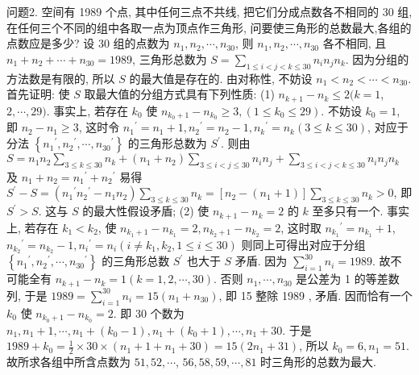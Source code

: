问题2. 空间有 1989 个点, 其中任何三点不共线, 把它们分成点数各不相同的 30 组,在任何三个不同的组中各取一点为顶点作三角形, 问要使三角形的总数最大,各组的点数应是多少? 
设 30 组的点数为 $n_1, n_2, \cdots, n_{30}$, 则 $n_1, n_2, \cdots, n_{30}$ 各不相同, 且 $n_1+ n_2+\cdots+n_{30}=1989$, 三角形总数为 $S=\sum_{1 \leqslant i<j<k \leqslant 30} n_i n_j n_k$. 因为分组的方法数是有限的, 所以 $S$ 的最大值是存在的.
由对称性, 不妨设 $n_1<n_2<\cdots<n_{30}$. 首先证明: 使 $S$ 取最大值的分组方式具有下列性质: (1) $n_{k+1}-n_k \leqslant 2(k=1$, $2, \cdots, 29)$. 事实上, 若存在 $k_0$ 使 $n_{k_0+1}-n_{k_0} \geqslant 3,\left(1 \leqslant k_0 \leqslant 29\right)$. 不妨设 $k_0=1$, 即 $n_2-n_1 \geqslant 3$, 这时令 $n_1{ }^{\prime}=n_1+1, n_2{ }^{\prime}=n_2-1, n_k{ }^{\prime}=n_k(3 \leqslant k \leqslant 30)$, 对应于分法 $\left\{n_1{ }^{\prime}, n_2{ }^{\prime}, \cdots, n_{30}{ }^{\prime}\right\}$ 的三角形总数为 $S^{\prime}$. 则由 $S=n_1 n_2 \sum_{3 \leqslant k \leqslant 30} n_k+\left(n_1+n_2\right) \sum_{3 \leqslant i<j \leqslant 30} n_i n_j+\sum_{3 \leqslant i<j<k \leqslant 30} n_i n_j n_k$ 及 $n_1+n_2=n_1{ }^{\prime}+n_2{ }^{\prime}$ 易得 $S^{\prime}-S=\left(n_1{ }^{\prime} n_2{ }^{\prime}-n_1 n_2\right) \sum_{3 \leqslant k \leqslant 30} n_k=\left[n_2-\left(n_1+1\right)\right] \sum_{3 \leqslant k \leqslant 30} n_k>0$, 即 $S^{\prime}>S$. 这与 $S$ 的最大性假设矛盾; (2) 使 $n_{k+1}-n_k=2$ 的 $k$ 至多只有一个.
事实上, 若存在 $k_1<k_2$, 使 $n_{k_1+1}-n_{k_1}=2, n_{k_2+1}-n_{k_2}=2$, 这时取 $n_{k_1}{ }^{\prime}=n_{k_1}+1$, $n_{k_2}{ }^{\prime}=n_{k_2}-1, n_i{ }^{\prime}=n_i\left(i \neq k_1, k_2, 1 \leqslant i \leqslant 30\right)$ 则同上可得出对应于分组 $\left\{n_1{ }^{\prime}, n_2{ }^{\prime}, \cdots, n_{30}{ }^{\prime}\right\}$ 的三角形总数 $S^{\prime}$ 也大于 $S$ 矛盾.
因为 $\sum_{i=1}^{30} n_i=1989$. 故不可能全有 $n_{k+1}-n_k=1(k=1,2, \cdots, 30)$. 否则 $n_1, \cdots, n_{30}$ 是公差为 1 的等差数列, 于是 $1989=\sum_{i=1}^{30} n_i=15\left(n_1+n_{30}\right)$, 即 15 整除 1989 , 矛盾.
因而恰有一个 $k_0$ 使 $n_{k_0+1}-n_{k_0}=2$. 即 30 个数为 $n_1, n_1+1, \cdots, n_1+\left(k_0-1\right), n_1+ \left(k_0+1\right), \cdots, n_1+30$. 于是 $1989+k_0=\frac{1}{2} \times 30 \times\left(n_1+1+n_1+30\right)= 15\left(2 n_1+31\right)$, 所以 $k_0=6, n_1=51$. 故所求各组中所含点数为 $51,52, \cdots$, $56,58,59, \cdots, 81$ 时三角形的总数为最大.



